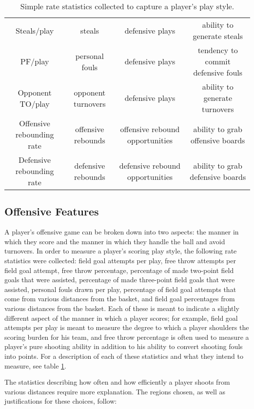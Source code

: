 \begin{table}
{\begin{tabular}{cccc}
        Steals/play & steals & defensive plays & ability to generate steals \\
        PF/play & personal fouls & defensive plays & tendency to commit
        defensive fouls \\
        Opponent TO/play & opponent turnovers & defensive plays & ability to
        generate turnovers \\
        \midrule
        Offensive rebounding rate & offensive rebounds & offensive rebound
        opportunities & ability to grab offensive boards \\
        Defensive rebounding rate & defensive rebounds & defensive rebound
        opportunities & ability to grab defensive boards \\
        \bottomrule
    \end{tabular}
    }
    \caption{Simple rate statistics collected to capture a player's play style.}
    \label{tab:features}
\end{table}

\subsection{Offensive Features}

A player's offensive game can be broken down into two aspects: the manner in which
they score and the manner in which they handle the ball and avoid turnovers. In
order to measure a player's scoring play style, the following rate statistics were
collected: field goal attempts per play, free throw attempts per field goal attempt,
free throw percentage, percentage of made two-point field goals that were assisted,
percentage of made three-point field goals that were assisted, personal fouls drawn
per play, percentage of field goal attempts that come from various distances from
the basket, and field goal percentages from various distances from the basket. Each
of these is meant to indicate a slightly different aspect of the manner in which a
player scores; for example, field goal attempts per play is meant to measure the
degree to which a player shoulders the scoring burden for his team, and free throw
percentage is often used to measure a player's pure shooting ability in addition to
his ability to convert shooting fouls into points. For a description of each of
these statistics and what they intend to measure, see table \ref{tab:features}.

The statistics describing how often and how efficiently a player shoots from various
distances require more explanation. The regions chosen, as well as justifications
for these choices, follow:

